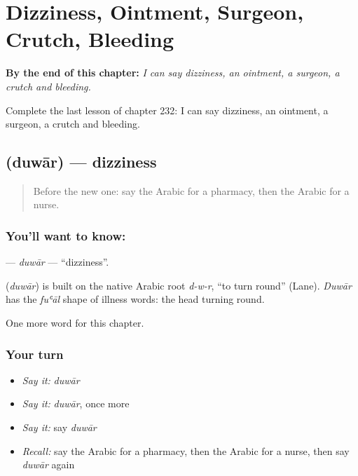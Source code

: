
\chapter{Dizziness, Ointment, Surgeon, Crutch, Bleeding}
\label{ch:ar-dizziness-ointment-surgeon-crutch-bleeding}

\begin{chapteropening}
\textbf{By the end of this chapter:} \emph{I can say dizziness, an ointment, a surgeon, a crutch and bleeding.}

Complete the last lesson of chapter 232: I can say dizziness, an ointment, a surgeon, a crutch and bleeding.
\end{chapteropening}

\section[\texorpdfstring{\ar{دوار} (duwār)}{دوار (duwār)}]{ (duwār) — dizziness}

\label{lesson:AR-C232-duwar}



\begin{quote}
Before the new one: say the Arabic for a pharmacy, then the Arabic for a nurse.
\end{quote}

\subsection*{You'll want to know: }
\textbf{} — \emph{duwār} — \textquotedblleft{}dizziness\textquotedblright{}.

\begin{cousinweb}
\textbf{} (\emph{duwār}) is built on the native Arabic root \emph{d-w-r}, \textquotedblleft{}to turn round\textquotedblright{} (Lane). \emph{Duwār} has the \emph{fuʿāl} shape of illness words: the head turning round.
\end{cousinweb}

\begin{grammarlens}[title={What you've built}]
One more word for this chapter.
\end{grammarlens}

\subsection*{Your turn}
\begin{itemize}
\raggedright
  \item \emph{Say it:} \emph{duwār}
  \item \emph{Say it:} \emph{duwār}, once more
  \item \emph{Say it:} say \emph{duwār}
  \item \emph{Recall:} say the Arabic for a pharmacy, then the Arabic for a nurse, then say \emph{duwār} again
\end{itemize}

